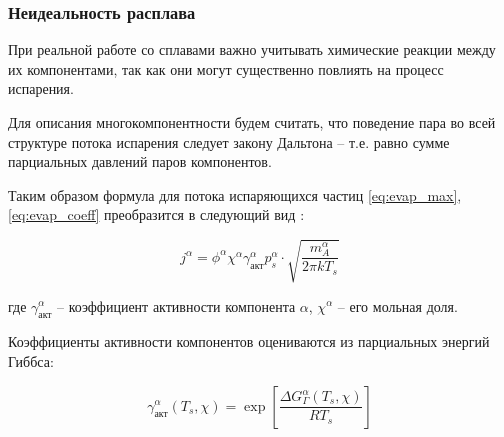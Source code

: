 \subsubsection{Неидеальность расплава}

При реальной работе со сплавами важно учитывать химические реакции между их компонентами, так как они могут существенно повлиять на процесс испарения.

Для описания многокомпонентности будем считать, что поведение пара во всей структуре потока испарения следует закону Дальтона -- т.е. равно сумме парциальных давлений паров компонентов.

Таким образом формула для потока испаряющихся частиц \ref{eq:evap_max}, \ref{eq:evap_coeff} преобразится в следующий вид \cite{klassen2018simulation}:

\begin{equation}
\label{eq:evap_multicomp_flow}
    j^{\alpha} = \phi^\alpha\chi^\alpha\gamma_{\text{акт}}^\alpha p^{\alpha}_s \cdot \sqrt{\frac{m_A^\alpha}{2\pi k T_s}}
\end{equation}

\noindent
где $\gamma_{\text{акт}}^\alpha$ -- коэффициент активности компонента $\alpha$, $\chi^\alpha$ -- его мольная доля.

Коэффициенты активности компонентов оцениваются из парциальных энергий Гиббса:

\begin{equation}
    \gamma_{\text{акт}}^\alpha(T_s, \chi) = \exp\left[ \frac{\Delta G^\alpha_\Gamma (T_s, \chi)}{RT_s} \right]
\end{equation}

